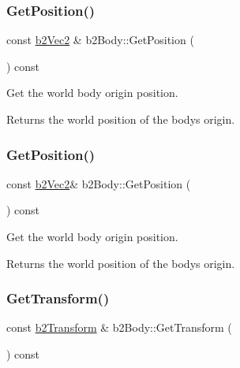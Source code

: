 \subsubsection{\texorpdfstring{Get\+Position()}{GetPosition()}\hspace{0.1cm}{\footnotesize\ttfamily [1/2]}}
{\footnotesize\ttfamily const \hyperlink{structb2Vec2}{b2\+Vec2} \& b2\+Body\+::\+Get\+Position (\begin{DoxyParamCaption}{ }\end{DoxyParamCaption}) const\hspace{0.3cm}{\ttfamily [inline]}}

Get the world body origin position. \begin{DoxyReturn}{Returns}
the world position of the body\textquotesingle{}s origin. 
\end{DoxyReturn}
\mbox{\label{classb2Body_ae44c1dc2f64fd42af1b77ed0843dd886}} 
\subsubsection{\texorpdfstring{Get\+Position()}{GetPosition()}\hspace{0.1cm}{\footnotesize\ttfamily [2/2]}}
{\footnotesize\ttfamily const \hyperlink{structb2Vec2}{b2\+Vec2}\& b2\+Body\+::\+Get\+Position (\begin{DoxyParamCaption}{ }\end{DoxyParamCaption}) const}

Get the world body origin position. \begin{DoxyReturn}{Returns}
the world position of the body\textquotesingle{}s origin. 
\end{DoxyReturn}
\mbox{\label{classb2Body_afb316448e6e555ceb2df23ed216b2f53}} 
\subsubsection{\texorpdfstring{Get\+Transform()}{GetTransform()}\hspace{0.1cm}{\footnotesize\ttfamily [1/2]}}
{\footnotesize\ttfamily const \hyperlink{structb2Transform}{b2\+Transform} \& b2\+Body\+::\+Get\+Transform (\begin{DoxyParamCaption}{ }\end{DoxyParamCaption}) const\hspace{0.3cm}{\ttfamily [inline]}}


